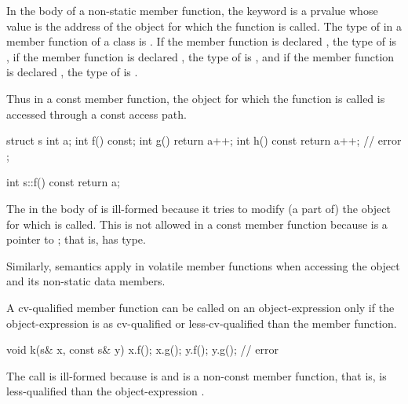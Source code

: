 \pnum
{}%
In the body of a non-static member function, the
keyword  is a prvalue whose value is the
address of the object for which the function is called.
%
The type of  in a member function of a class  is
.
If the member function is declared , the type of
 is  ,
if the member function is declared , the type of
 is  , and if the member function
is declared  , the type of  is
  .
\begin{note} Thus in a const member function, the object for which the function is
called is accessed through a const access path. \end{note}
\begin{example}

\begin{codeblock}
struct s {
  int a;
  int f() const;
  int g() { return a++; }
  int h() const { return a++; } // error
};

int s::f() const { return a; }
\end{codeblock}

The  in the body of  is ill-formed because it
tries to modify (a part of) the object for which  is
called. This is not allowed in a const member function because
 is a pointer to ; that is,  has
 type.
\end{example}

\pnum
Similarly,  semantics apply in
volatile member functions when accessing the object and its
non-static data members.

\pnum
A cv-qualified member function can be called on an
object-expression only if the object-expression is as
cv-qualified or less-cv-qualified than the member function.
\begin{example}

\begin{codeblock}
void k(s& x, const s& y) {
  x.f();
  x.g();
  y.f();
  y.g();                        // error
}
\end{codeblock}

The call  is ill-formed because  is 
and  is a non-const member function, that is,
 is less-qualified than the object-expression .
\end{example}


